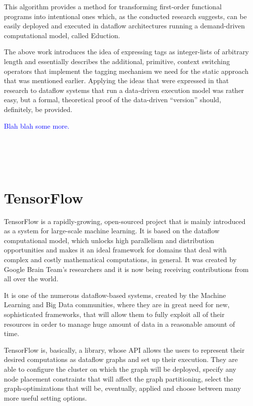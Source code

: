 \documentclass[ack,preface]{dithesis}
\begin{document}
This algorithm provides a method for transforming first-order functional programs into intentional ones which, as the conducted research suggests, can be easily deployed and executed in dataflow architectures running a demand-driven computational model, called Eduction.

The above work introduces the idea of expressing tags as integer-lists of arbitrary length and essentially describes the additional, primitive, context switching operators that implement the tagging mechanism we need for the static approach that was mentioned earlier. Applying the ideas that were expressed in that research to dataflow systems that run a data-driven execution model was rather easy, but a formal, theoretical proof of the data-driven “version” should, definitely, be provided.

 \textcolor{blue}{Blah blah some more.} \\\\\\\\\

    \section{TensorFlow}

TensorFlow  \cite{Abadi:2016} is a rapidly-growing, open-sourced project that is mainly introduced as a system for large-scale machine learning. It is based on the dataflow computational model, which unlocks high parallelism and distribution opportunities and makes it an ideal framework for domains that deal with complex and costly mathematical computations, in general. It was created by Google Brain Team’s researchers and it is now being receiving contributions from all over the world. 

It is one of the numerous \cite{Zaharia:2012,Rossbach:2013, Theano, Jia2014caffe} dataflow-based systems, created by the Machine Learning and Big Data communities, where they are in great need for new, sophisticated frameworks, that will allow them to fully exploit all of their resources in order to manage huge amount of data in a reasonable amount of time.

TensorFlow is, basically, a library, whose API allows the users to represent their desired computations as dataflow graphs and set up their execution. 
They are able to configure the cluster on which the graph will be deployed, specify any node placement constraints that will affect the graph partitioning, select the graph-optimizations that will be, eventually, applied and choose between many more useful setting options.
\end{document}
